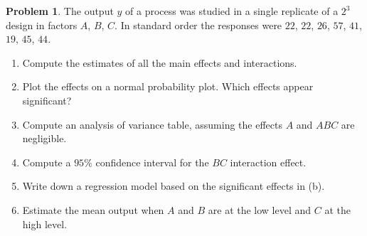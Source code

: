 \documentclass[11pt,a4paper]{article}
\numberwithin{equation}{section}
\theoremstyle{definition}
\newtheorem{problemx}{Problem}[subsection]
\newenvironment{problem}{\begin{problemx}}{\end{problemx}}
\begin{document}
\begin{problem}
The output $y$ of a process was studied in a single replicate of a $2^3$ design in factors $A$, $B$, $C$. In standard order the responses were $22$, $22$, $26$, $57$, $41$,
$19$, $45$, $44$.
\begin{enumerate}[label=(\alph*)]
\item Compute the estimates of all the main effects and interactions.
\item Plot the effects on a normal probability plot. Which effects appear significant?
\item Compute an analysis of variance table, assuming the effects $A$ and $ABC$ are negligible.
\item Compute a $95\%$ confidence interval for the $BC$ interaction effect.
\item Write down a regression model based on the significant effects in (b).
\item Estimate the mean output when $A$ and $B$ are at the low level and $C$ at the high level.
\end{enumerate}
\end{problem}
\end{document}
